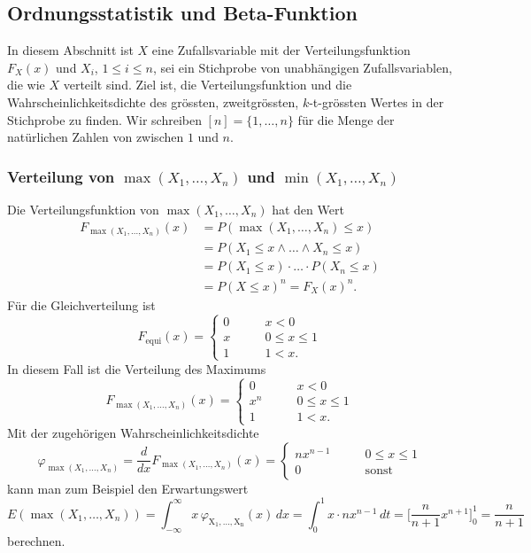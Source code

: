 %
%
%
\subsection{Ordnungsstatistik und Beta-Funktion
\label{buch:rekursion:ordnung:section:ordnungsstatistik}}
In diesem Abschnitt ist $X$ eine Zufallsvariable mit der Verteilungsfunktion
$F_X(x)$ und $X_i$, $1\le i\le n$, sei ein Stichprobe von unabhängigen
Zufallsvariablen, die wie $X$ verteilt sind.
Ziel ist, die Verteilungsfunktion und die Wahrscheinlichkeitsdichte
des grössten, zweitgrössten, $k$-t-grössten Wertes in der Stichprobe
zu finden.
Wir schreiben $[n]=\{1,\dots,n\}$ für die Menge der natürlichen
Zahlen von zwischen $1$ und $n$.

\subsubsection{Verteilung von $\operatorname{max}(X_1,\dots,X_n)$ und
$\operatorname{min}(X_1,\dots,X_n)$
\label{buch:rekursion:ordnung:subsection:minmax}}
Die Verteilungsfunktion von $\operatorname{max}(X_1,\dots,X_n)$ hat
den Wert
\begin{align*}
F_{\operatorname{max}(X_1,\dots,X_n)}(x)
&=
P(\operatorname{max}(X_1,\dots,X_n) \le x)
\\
&=
P(X_1\le x\wedge \dots \wedge X_n\le x)
\\
&=
P(X_1\le x) \cdot \ldots \cdot P(X_n\le x)
\\
&=
P(X\le x)^n
=
F_X(x)^n.
\end{align*}
Für die Gleichverteilung ist
\[
F_{\text{equi}}(x)
=
\begin{cases}
0&\qquad x< 0
\\
x&\qquad 0\le x\le 1
\\
1&\qquad 1<x.
\end{cases}
\]
In diesem Fall ist die Verteilung des Maximums
\[
F_{\operatorname{max}(X_1,\dots,X_n)}(x)
=
\begin{cases}
0&\qquad x<0\\
x^n&\qquad 0\le x\le 1\\
1&\qquad 1 < x.
\end{cases}
\]
Mit der zugehörigen Wahrscheinlichkeitsdichte
\[
\varphi_{\operatorname{max}(X_1,\dots,X_n)}
=
\frac{d}{dx}
F_{\operatorname{max}(X_1,\dots,X_n)}(x)
=
\begin{cases}
nx^{n-1}&\qquad 0\le x\le 1\\
0       &\qquad \text{sonst}
\end{cases}
\]
kann man zum Beispiel den Erwartungswert
\[
E(\operatorname{max}(X_1,\dots,X_n))
=
\int_{-\infty}^\infty 
x\,
\varphi_{\operatorname{X_1,\dots,X_n}}(x)
\,dx
=
\int_{0}^1 x\cdot nx^{n-1}\,dt
=
\biggl[
\frac{n}{n+1}x^{n+1}
\biggr]_0^1
=
\frac{n}{n+1}
\]
berechnen.

